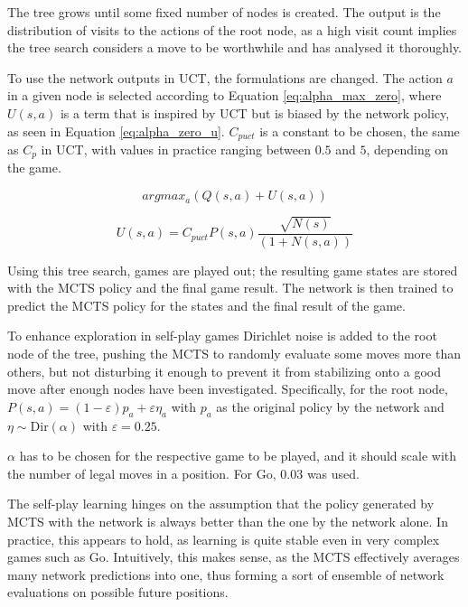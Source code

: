 \documentclass[12pt,onecolumn,oneside,titlepage]{article}
\begin{document}
The tree grows until some fixed number of nodes is created. The output is the distribution of visits to the actions of the root node, as a high visit count 
implies the tree search considers a move to be worthwhile and has analysed it thoroughly.

To use the network outputs in UCT, the formulations are changed.
The action $a$ in a given node is selected according to Equation \ref{eq:alpha_max_zero}, where $U(s,a)$ is a term that is inspired by UCT but is biased by the network policy, as seen in Equation \ref{eq:alpha_zero_u}.
$C_{puct}$ is a constant to be chosen, the same as $C_p$ in UCT, with values in practice ranging between $0.5$ and $5$, depending on the game.

\begin{equation}
 argmax_a(Q(s, a) + U(s, a))\label{eq:alpha_max_zero}
\end{equation}

\begin{equation}
 U(s,a) = C_{puct} P(s,a) \frac{\sqrt{N(s)}}{(1+N(s,a))}\label{eq:alpha_zero_u}
\end{equation}

Using this tree search, games are played out; the resulting game states are stored with the MCTS policy and the final game result. 
The network is then trained to predict the MCTS policy for the states and the final result of the game.

To enhance exploration in self-play games Dirichlet noise is added to the root node of the tree, pushing the MCTS to randomly evaluate some moves more than others, but not disturbing it enough to prevent it from stabilizing onto a good move after enough nodes have been investigated.
Specifically, for the root node, $P(s, a) = (1 - \varepsilon)p_a+ \varepsilon \eta_a$ with $p_a$ as the original policy by the network and $\eta \sim \text{Dir}(\alpha)$ with $\varepsilon = 0.25$.

$\alpha$ has to be chosen for the respective game to be played,
and it should scale with the number of legal moves in a position. For Go, $0.03$ was used.

The self-play learning hinges on the assumption that the policy generated by MCTS with the network is always better than the one by the network alone.
In practice, this appears to hold, as learning is quite stable even in very complex games such as Go. Intuitively, this makes sense,
as the MCTS effectively averages many network predictions into one, thus forming a sort of ensemble of network evaluations on possible future positions.
\end{document}
